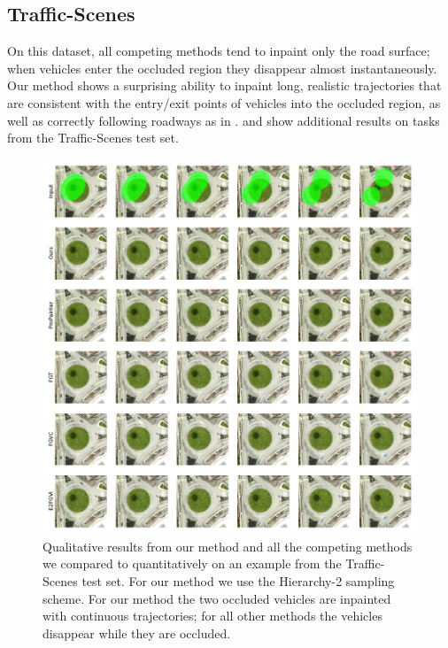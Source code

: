 \subsection{Traffic-Scenes} On this dataset, all competing methods tend to inpaint only the road surface; when vehicles enter the occluded region they disappear almost instantaneously. Our method shows a surprising ability to inpaint long, realistic trajectories that are consistent with the entry/exit points of vehicles into the occluded region, as well as correctly following roadways as in .  and  show additional results on tasks from the Traffic-Scenes test set.%
\begin{figure}
\begin{center}
    \centering
    \captionsetup{type=figure}
    \includegraphics[width=\linewidth]{figures/additional-samples/ts1.pdf}
    \caption[Qualitative results from our method and all competing methods on an example from the Traffic-Scenes test set.]{Qualitative results from our method and all the competing methods we compared to quantitatively on an example from the Traffic-Scenes test set. For our method we use the Hierarchy-2 sampling scheme. For our method the two occluded vehicles are inpainted with continuous trajectories; for all other methods the vehicles disappear while they are occluded.} 
    \label{fig:ts1}
\end{center}
\end{figure}
    
